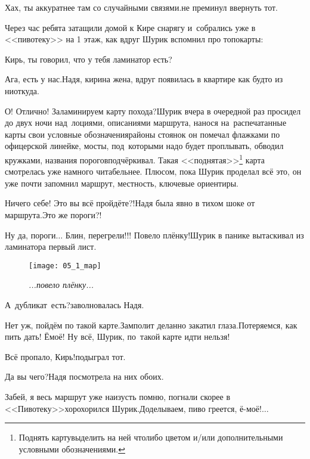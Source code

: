 \diagdash Хах, ты аккуратнее там со случайными связями.\mdash не преминул ввернуть тот. %

Через час ребята затащили домой к Кире снарягу и~собрались уже в <<пивотеку>> на 1 этаж, как вдруг Шурик вспомнил про топокарты:

\diagdash Кирь, ты говорил, что у тебя ламинатор есть?

\diagdash Ага, есть у нас.\mdash Надя, кирина жена, вдруг появилась в квартире как будто из ниоткуда.

\renewcommand*{\thefootnote}{\fnsymbol{footnote}}
\diagdash О! Отлично! Заламинируем карту похода?\mdash Шурик вчера в очередной раз просидел до двух ночи над~лоциями, описаниями маршрута, нанося на~распечатанные карты свои условные обозначения\mdash районы стоянок он помечал флажками по офицерской линейке, мосты, под~которыми надо будет проплывать, обводил кружками, названия порогов\mdash подчёркивал. Такая <<поднятая>>\footnote[1]{Поднять карту\mdash выделить на ней что\sdash либо цветом и/или дополнительными условными обозначениями.} карта смотрелась уже намного читабельнее. Плюсом, пока Шурик проделал всё это, он уже почти запомнил маршрут, местность, ключевые ориентиры.

\diagdash Ничего себе! Это вы всё пройдёте?!\mdash Надя была явно в тихом шоке от маршрута.\mdash Это же пороги?!

\diagdash Ну да, пороги$\ldots$ Блин, перегрели!!! Повело плёнку!\mdash Шурик в панике вытаскивал из ламинатора первый лист.\begin{wrapfigure}[11]{l}{0.49\textwidth}
	\centering	
	\texttt{[image: 05\_1\_map]}
	\caption{\small\textit{...повело плёнку...}}
\end{wrapfigure}

\diagdash А~дубликат~есть?\mdash заволновалась Надя.

\diagdash Нет уж, пойдём по такой карте.\mdash Замполит деланно закатил глаза.\mdash Потеряемся, как пить дать! Ё\sdash моё! Ну всё, Шурик, по~такой карте идти нельзя! 

\diagdash Всё пропало, Кирь!\mdash подыграл тот.


\diagdash Да вы чего?\mdash Надя посмотрела на них обоих.

\diagdash Забей, я весь маршрут уже наизусть помню, погнали скорее в <<Пивотеку>>\mdash хорохорился Шурик.\mdash Доделываем, пиво греется, ё-моё!$\ldots$

